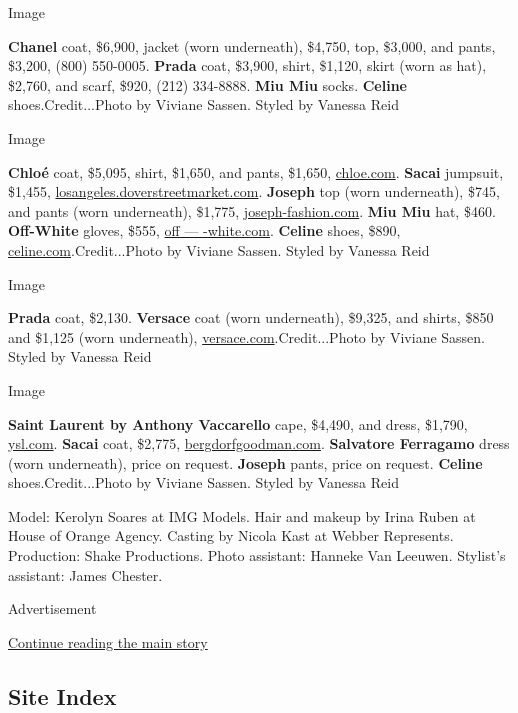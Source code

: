 Image

\textbf{Chanel} coat, \$6,900, jacket (worn underneath), \$4,750, top,
\$3,000, and pants, \$3,200, (800) 550-0005. \textbf{Prada} coat,
\$3,900, shirt, \$1,120, skirt (worn as hat), \$2,760, and scarf, \$920,
(212) 334-8888. \textbf{Miu Miu} socks. \textbf{Celine}
shoes.Credit...Photo by Viviane Sassen. Styled by Vanessa Reid

Image

\textbf{Chloé} coat, \$5,095, shirt, \$1,650, and pants, \$1,650,
\href{https://www.chloe.com/us}{chloe.com}. \textbf{Sacai} jumpsuit,
\$1,455,
\href{https://losangeles.doverstreetmarket.com/}{losangeles.doverstreetmarket.com}.
\textbf{Joseph} top (worn underneath), \$745, and pants (worn
underneath), \$1,775,
\href{https://www.joseph-fashion.com/}{joseph-fashion.com}. \textbf{Miu
Miu} hat, \$460. \textbf{Off-White} gloves, \$555,
\href{https://www.off---white.com/en/US}{off --- -white.com}.
\textbf{Celine} shoes, \$890,
\href{https://www.celine.com/en-us/home}{celine.com}.Credit...Photo by
Viviane Sassen. Styled by Vanessa Reid

Image

\textbf{Prada} coat, \$2,130. \textbf{Versace} coat (worn underneath),
\$9,325, and shirts, \$850 and \$1,125 (worn underneath),
\href{https://www.versace.com/}{versace.com}.Credit...Photo by Viviane
Sassen. Styled by Vanessa Reid

Image

\textbf{Saint Laurent by Anthony Vaccarello} cape, \$4,490, and dress,
\$1,790, \href{http://ysl.com/}{ysl.com}. \textbf{Sacai} coat, \$2,775,
\href{http://bergdorfgoodman.com/}{bergdorfgoodman.com}.
\textbf{Salvatore Ferragamo} dress (worn underneath), price on request.
\textbf{Joseph} pants, price on request. \textbf{Celine}
shoes.Credit...Photo by Viviane Sassen. Styled by Vanessa Reid

Model: Kerolyn Soares at IMG Models. Hair and makeup by Irina Ruben at
House of Orange Agency. Casting by Nicola Kast at Webber Represents.
Production: Shake Productions. Photo assistant: Hanneke Van Leeuwen.
Stylist's assistant: James Chester.

Advertisement

\protect\hyperlink{after-bottom}{Continue reading the main story}

\hypertarget{site-index}{%
\subsection{Site Index}\label{site-index}}

